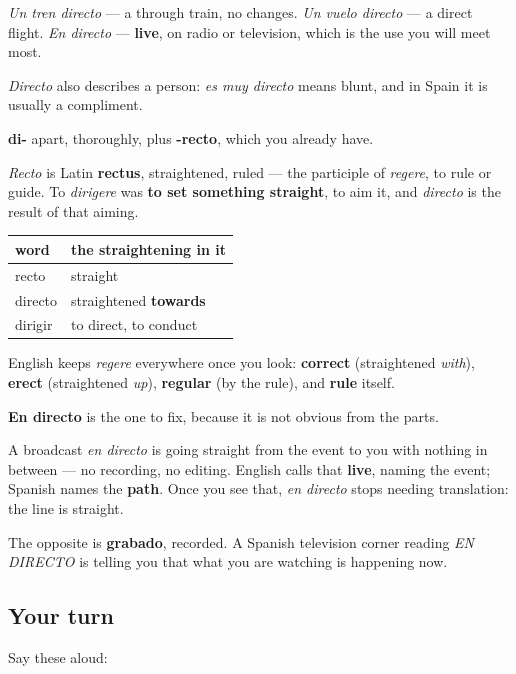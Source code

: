 \emph{Un tren directo} — a through train, no changes. \emph{Un vuelo directo} — a direct flight. \emph{En directo} — \textbf{live}, on radio or television, which is the use you will meet most.

\emph{Directo} also describes a person: \emph{es muy directo} means blunt, and in Spain it is usually a compliment.

\begin{cousinweb}
\textbf{di-} apart, thoroughly, plus \textbf{-recto}, which you already have.

\emph{Recto} is Latin \textbf{rectus}, straightened, ruled — the participle of \emph{regere}, to rule or guide. To \emph{dirigere} was \textbf{to set something straight}, to aim it, and \emph{directo} is the result of that aiming.

\noindent
\begin{tabularx}{\linewidth}{@{}>{\raggedright\arraybackslash}X>{\raggedright\arraybackslash}X@{}}
\toprule
\textbf{word} & \textbf{the straightening in it} \\
\midrule
recto & straight \\
directo & straightened \textbf{towards} \\
dirigir & to direct, to conduct \\
\bottomrule
\end{tabularx}

English keeps \emph{regere} everywhere once you look: \textbf{correct} (straightened \emph{with}), \textbf{erect} (straightened \emph{up}), \textbf{regular} (by the rule), and \textbf{rule} itself.
\end{cousinweb}

\begin{culture}
\textbf{En directo} is the one to fix, because it is not obvious from the parts.

A broadcast \emph{en directo} is going straight from the event to you with nothing in between — no recording, no editing. English calls that \textbf{live}, naming the event; Spanish names the \textbf{path}. Once you see that, \emph{en directo} stops needing translation: the line is straight.

The opposite is \textbf{grabado}, recorded. A Spanish television corner reading \emph{EN DIRECTO} is telling you that what you are watching is happening now.
\end{culture}

\subsection*{Your turn}
Say these aloud:

